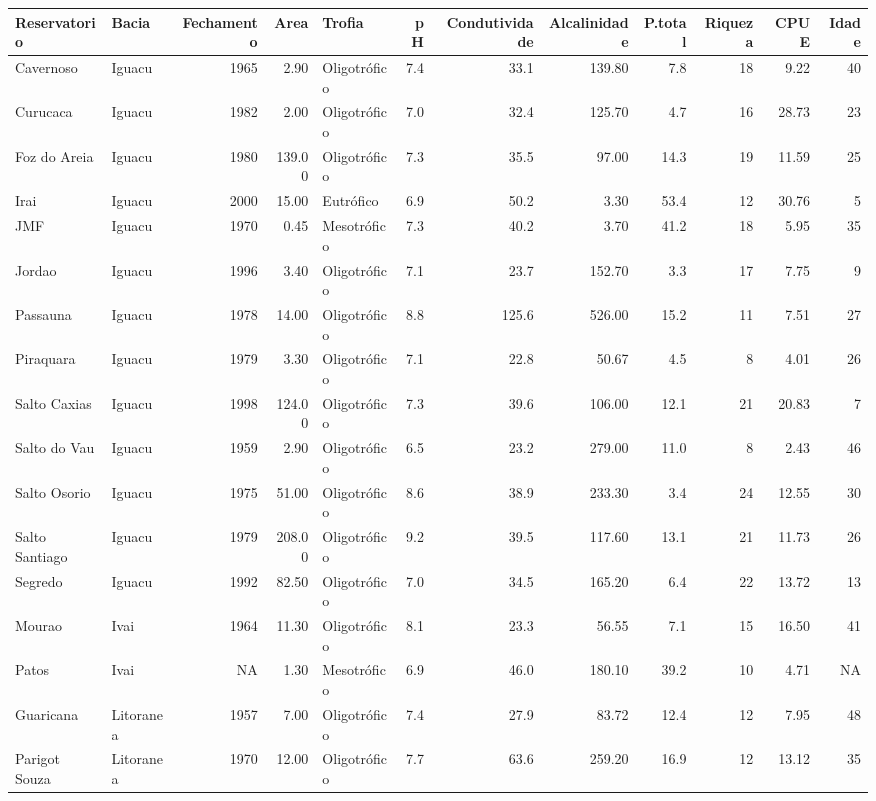 \documentclass[
]{book}
\begin{document}
\begin{table}
\centering\begingroup\fontsize{8}{10}\selectfont

\begin{tabular}{llrrlrrrrrrr}
\toprule
Reservatorio & Bacia & Fechamento & Area & Trofia & pH & Condutividade & Alcalinidade & P.total & Riqueza & CPUE & Idade\\
\midrule
Cavernoso & Iguacu & 1965 & 2.90 & Oligotrófico & 7.4 & 33.1 & 139.80 & 7.8 & 18 & 9.22 & 40\\
Curucaca & Iguacu & 1982 & 2.00 & Oligotrófico & 7.0 & 32.4 & 125.70 & 4.7 & 16 & 28.73 & 23\\
Foz do Areia & Iguacu & 1980 & 139.00 & Oligotrófico & 7.3 & 35.5 & 97.00 & 14.3 & 19 & 11.59 & 25\\
Irai & Iguacu & 2000 & 15.00 & Eutrófico & 6.9 & 50.2 & 3.30 & 53.4 & 12 & 30.76 & 5\\
JMF & Iguacu & 1970 & 0.45 & Mesotrófico & 7.3 & 40.2 & 3.70 & 41.2 & 18 & 5.95 & 35\\
\addlinespace
Jordao & Iguacu & 1996 & 3.40 & Oligotrófico & 7.1 & 23.7 & 152.70 & 3.3 & 17 & 7.75 & 9\\
Passauna & Iguacu & 1978 & 14.00 & Oligotrófico & 8.8 & 125.6 & 526.00 & 15.2 & 11 & 7.51 & 27\\
Piraquara & Iguacu & 1979 & 3.30 & Oligotrófico & 7.1 & 22.8 & 50.67 & 4.5 & 8 & 4.01 & 26\\
Salto Caxias & Iguacu & 1998 & 124.00 & Oligotrófico & 7.3 & 39.6 & 106.00 & 12.1 & 21 & 20.83 & 7\\
Salto do Vau & Iguacu & 1959 & 2.90 & Oligotrófico & 6.5 & 23.2 & 279.00 & 11.0 & 8 & 2.43 & 46\\
\addlinespace
Salto Osorio & Iguacu & 1975 & 51.00 & Oligotrófico & 8.6 & 38.9 & 233.30 & 3.4 & 24 & 12.55 & 30\\
Salto Santiago & Iguacu & 1979 & 208.00 & Oligotrófico & 9.2 & 39.5 & 117.60 & 13.1 & 21 & 11.73 & 26\\
Segredo & Iguacu & 1992 & 82.50 & Oligotrófico & 7.0 & 34.5 & 165.20 & 6.4 & 22 & 13.72 & 13\\
Mourao & Ivai & 1964 & 11.30 & Oligotrófico & 8.1 & 23.3 & 56.55 & 7.1 & 15 & 16.50 & 41\\
Patos & Ivai & NA & 1.30 & Mesotrófico & 6.9 & 46.0 & 180.10 & 39.2 & 10 & 4.71 & NA\\
\addlinespace
Guaricana & Litoranea & 1957 & 7.00 & Oligotrófico & 7.4 & 27.9 & 83.72 & 12.4 & 12 & 7.95 & 48\\
Parigot Souza & Litoranea & 1970 & 12.00 & Oligotrófico & 7.7 & 63.6 & 259.20 & 16.9 & 12 & 13.12 & 35\\

\end{tabular}
\end{table}
\end{document}
